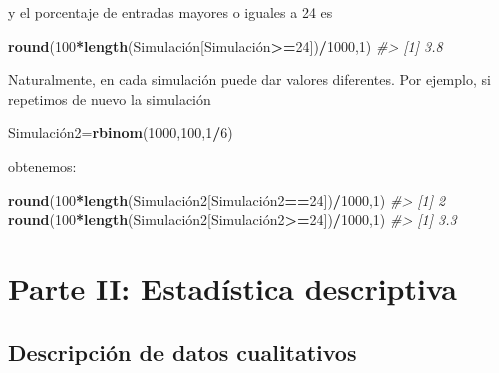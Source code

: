\documentclass[
]{book}
\newenvironment{Shaded}{\begin{snugshade}}{\end{snugshade}}
\newcommand{\CommentTok}[1]{\textcolor[rgb]{0.56,0.35,0.01}{\textit{#1}}}
\newcommand{\DecValTok}[1]{\textcolor[rgb]{0.00,0.00,0.81}{#1}}
\newcommand{\KeywordTok}[1]{\textcolor[rgb]{0.13,0.29,0.53}{\textbf{#1}}}
\newcommand{\NormalTok}[1]{#1}
\newcommand{\OperatorTok}[1]{\textcolor[rgb]{0.81,0.36,0.00}{\textbf{#1}}}
\theoremstyle{definition}
\theoremstyle{definition}
\theoremstyle{definition}
\theoremstyle{remark}
\begin{document}
y el porcentaje de entradas mayores o iguales a 24 es

\begin{Shaded}
\begin{Highlighting}[]
\KeywordTok{round}\NormalTok{(}\DecValTok{100}\OperatorTok{*}\KeywordTok{length}\NormalTok{(Simulación[Simulación}\OperatorTok{\textgreater{}=}\DecValTok{24}\NormalTok{])}\OperatorTok{/}\DecValTok{1000}\NormalTok{,}\DecValTok{1}\NormalTok{)}
\CommentTok{\#\textgreater{} [1] 3.8}
\end{Highlighting}
\end{Shaded}

Naturalmente, en cada simulación puede dar valores diferentes. Por ejemplo, si repetimos de nuevo la simulación

\begin{Shaded}
\begin{Highlighting}[]
\NormalTok{Simulación2=}\KeywordTok{rbinom}\NormalTok{(}\DecValTok{1000}\NormalTok{,}\DecValTok{100}\NormalTok{,}\DecValTok{1}\OperatorTok{/}\DecValTok{6}\NormalTok{)}
\end{Highlighting}
\end{Shaded}

obtenemos:

\begin{Shaded}
\begin{Highlighting}[]
\KeywordTok{round}\NormalTok{(}\DecValTok{100}\OperatorTok{*}\KeywordTok{length}\NormalTok{(Simulación2[Simulación2}\OperatorTok{==}\DecValTok{24}\NormalTok{])}\OperatorTok{/}\DecValTok{1000}\NormalTok{,}\DecValTok{1}\NormalTok{)}
\CommentTok{\#\textgreater{} [1] 2}
\KeywordTok{round}\NormalTok{(}\DecValTok{100}\OperatorTok{*}\KeywordTok{length}\NormalTok{(Simulación2[Simulación2}\OperatorTok{\textgreater{}=}\DecValTok{24}\NormalTok{])}\OperatorTok{/}\DecValTok{1000}\NormalTok{,}\DecValTok{1}\NormalTok{)}
\CommentTok{\#\textgreater{} [1] 3.3}
\end{Highlighting}
\end{Shaded}

\hypertarget{part-parte-ii-estaduxedstica-descriptiva}{%
\part*{Parte II: Estadística descriptiva}\label{part-parte-ii-estaduxedstica-descriptiva}}

\hypertarget{chap:edqual}{%
\chapter{Descripción de datos cualitativos}\label{chap:edqual}}
\end{document}
